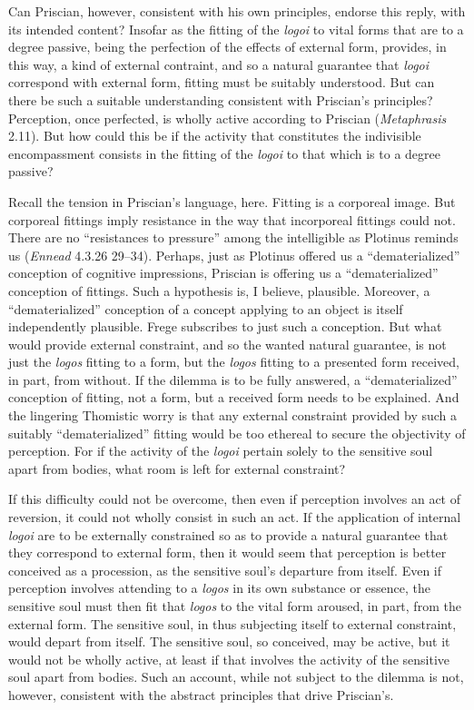 \documentclass[12pt]{article}
\begin{document}
Can Priscian, however, consistent with his own principles, endorse this reply, with its intended content? Insofar as the fitting of the \emph{logoi} to vital forms that are to a degree passive, being the perfection of the effects of external form, provides, in this way, a kind of external contraint, and so a natural guarantee that \emph{logoi} correspond with external form, fitting must be suitably understood. But can there be such a suitable understanding consistent with Priscian's principles? Perception, once perfected, is wholly active according to Priscian (\emph{Metaphrasis} 2.11). But how could this be if the activity that constitutes the indivisible encompassment consists in the fitting of the \emph{logoi} to that which is to a degree passive?

Recall the tension in Priscian's language, here. Fitting is a corporeal image. But corporeal fittings imply resistance in the way that incorporeal fittings could not. There are no ``resistances to pressure'' among the intelligible as Plotinus reminds us (\emph{Ennead} 4.3.26 29--34). Perhaps, just as Plotinus offered us a ``dematerialized'' conception of cognitive impressions, Priscian is offering us a ``dematerialized'' conception of fittings. Such a hypothesis is, I believe, plausible. Moreover, a ``dematerialized'' conception of a concept applying to an object is itself independently plausible. Frege subscribes to just such a conception. But what would provide external constraint, and so the wanted natural guarantee, is not just the \emph{logos} fitting to a form, but the \emph{logos} fitting to a presented form received, in part, from without. If the dilemma is to be fully answered, a ``dematerialized'' conception of fitting, not a form, but a received form needs to be explained. And the lingering Thomistic worry is that any external constraint provided by such a suitably ``dematerialized'' fitting would be too ethereal to secure the objectivity of perception. For if the activity of the \emph{logoi} pertain solely to the sensitive soul apart from bodies, what room is left for external constraint? 

If this difficulty could not be overcome, then even if perception involves an act of reversion, it could not wholly consist in such an act. If the application of internal \emph{logoi} are to be externally constrained so as to provide a natural guarantee that they correspond to external form, then it would seem that perception is better conceived as a procession, as the sensitive soul's departure from itself. Even if perception involves attending to a \emph{logos} in its own substance or essence, the sensitive soul must then fit that \emph{logos} to the vital form aroused, in part, from the external form. The sensitive soul, in thus subjecting itself to external constraint, would depart from itself. The sensitive soul, so conceived, may be active, but it would not be wholly active, at least if that involves the activity of the sensitive soul apart from bodies. Such an account, while not subject to the dilemma is not, however, consistent with the abstract principles that drive Priscian's.
\end{document}
